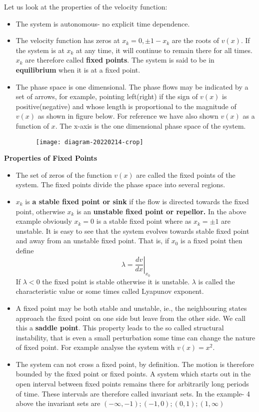 Let us look at the properties of the velocity function:\\
\begin{itemize}
	\item The system is autonomous- no explicit time dependence.
	\item The velocity function has zeros at $x_{k}=0, \pm 1-x_{k}$ are the roots of $v(x)$. If the system is at $x_{k}$ at any time, it will continue to remain there for all times. $x_{k}$ are therefore called \textbf{fixed points}. The system is said to be in \textbf{equilibrium} when it is at a fixed point.
	\item The phase space is one dimensional. The phase flows may be indicated by a set of arrows, for example, pointing left(right) if the sign of $v(x)$ is positive(negative) and whose length is proportional to the magnitude of $v(x)$ as shown in figure below. For reference we have also shown $v(x)$ as a function of $x$. The $\mathrm{x}$-axis is the one dimensional phase space of the system.\\
	\begin{figure}[H]
		\centering
		\texttt{[image: diagram-20220214-crop]}
		\caption{}
		\label{}
	\end{figure}
\end{itemize}
\textbf{ Properties of Fixed Points}
\begin{itemize}
	\item  The set of zeros of the function $v(x)$ are called the fixed points of the system. The fixed points divide the phase space into several regions.
	\item $x_{k}$ is \textbf{a stable fixed point or sink} if the flow is directed towards the fixed point, otherwise $x_{k}$ is an \textbf{unstable fixed point or repellor.} In the above example obviously $x_{k}=0$ is a stable fixed point where as $x_{k}=\pm 1$ are unstable. It is easy to see that the system evolves towards stable fixed point and away from an unstable fixed point. That is, if $x_{0}$ is a fixed point then define
	$$
	\lambda=\left.\frac{d v}{d x}\right|_{x_{0}}
	$$
	If $\lambda<0$ the fixed point is stable otherwise it is unstable. $\lambda$ is called the characteristic value or some times called Lyapunov exponent.
	\item A fixed point may be both stable and unstable, ie., the neighbouring states approach the fixed point on one side but leave from the other side. We call this a \textbf{saddle point}. This property leads to the so called structural instability, that is even a small perturbation some time can change the nature of fixed point. For example analyse the system with $v(x)=x^{2}$.
	\item The system can not cross a fixed point, by definition. The motion is therefore bounded by the fixed point or fixed points. A system which starts out in the open interval between fixed points remains there for arbitrarily long periods of time. These intervals are therefore called invariant sets. In the example- 4 above the invariant sets are $(-\infty,-1) ;(-1,0) ;(0,1) ;(1, \infty)$
\end{itemize}
